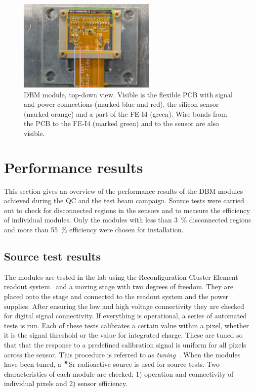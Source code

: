 \begin{figure}[!t]
\centering
\includegraphics[width=0.6\textwidth]{04_charge_monitoring/pics/mod2}
\caption{DBM module, top-down view. Visible is the flexible PCB with signal and power connections (marked blue and red), the silicon sensor (marked orange) and a part of the FE-I4 (green). Wire bonds from the PCB to the FE-I4 (marked green) and to the sensor are also visible.}
\label{fig:completedmod}
\end{figure}



\section{Performance results}
\label{sec:perfresults}
This section gives an overview of the performance results of the DBM modules achieved during the QC and the test beam campaign. Source tests were carried out to check for disconnected regions in the sensors and to measure the efficiency of individual modules. Only the modules with less than 3~\% disconnected regions and more than 55~\% efficiency were chosen for installation. 


\subsection{Source test results}
The modules are tested in the lab using the Reconfiguration Cluster Element readout system~\cite{Claus:2021543} and a moving stage with two degrees of freedom. They are placed onto the stage and connected to the readout system and the power supplies. After ensuring the low and high voltage connectivity they are checked for digital signal connectivity. If everything is operational, a series of automated tests is run. Each of these tests calibrates a certain value within a pixel, whether it is the signal threshold or the value for integrated charge. These are tuned so that that the response to a predefined calibration signal is uniform for all pixels across the sensor. This procedure is referred to as \emph{tuning}~\cite{ATLIBL:00001}. When the modules have been tuned, a $^{90}$Sr radioactive source is used for source tests. Two characteristics of each module are checked: 1) operation and connectivity of individual pixels and 2) sensor efficiency. 

